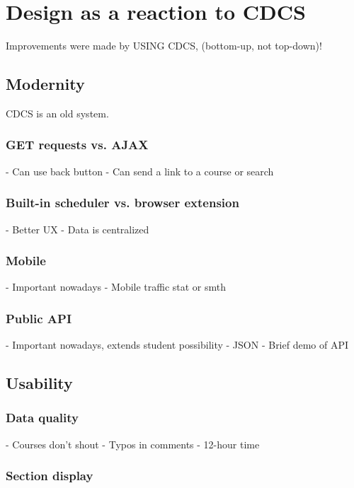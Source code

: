 
\chapter{Design as a reaction to CDCS}

Improvements were made by USING CDCS, (bottom-up, not top-down)!


\section{Modernity}

CDCS is an old system.

\subsection{GET requests vs. AJAX}

- Can use back button
- Can send a link to a course or search

\subsection{Built-in scheduler vs. browser extension}

- Better UX
- Data is centralized

\subsection{Mobile}

- Important nowadays
- Mobile traffic stat or smth

\subsection{Public API}

- Important nowadays, extends student possibility
- JSON
- Brief demo of API


\section{Usability}

\subsection{Data quality}

- Courses don't shout
- Typos in comments
- 12-hour time

\subsection{Section display}

